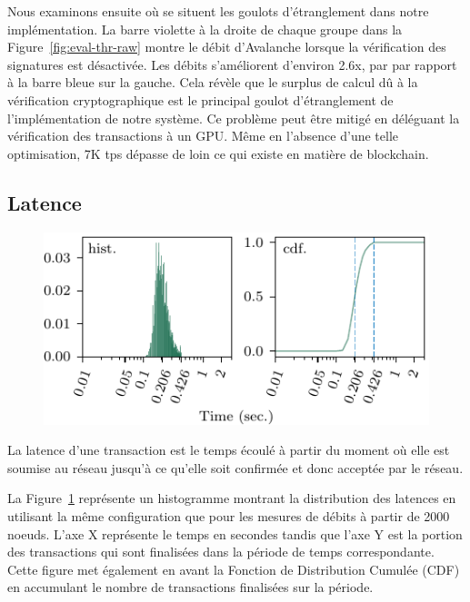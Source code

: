 Nous examinons ensuite où se situent les goulots d'étranglement dans notre implémentation.
La barre violette à la droite de chaque groupe dans la Figure~\ref{fig:eval-thr-raw} montre le débit
d'Avalanche lorsque la vérification des signatures est désactivée. Les débits s'améliorent d'environ 2.6x, par
par rapport à la barre bleue sur la gauche.
Cela révèle que le surplus de calcul dû à la vérification cryptographique est le principal goulot d'étranglement
de l'implémentation de notre système. Ce problème peut être mitigé en déléguant la vérification des transactions
à un GPU\@. Même en l'absence d'une telle optimisation, 7K tps dépasse de loin ce qui existe en matière de blockchain.

\subsection{Latence}

\begin{figure}
\includegraphics[width=\linewidth]{figures/lat.pdf}
\label{fig:eval-lat1}
\end{figure}

La latence d'une transaction est le temps écoulé à partir du moment où elle est soumise au réseau jusqu'à ce qu'elle
soit confirmée et donc acceptée par le réseau.

La Figure~\ref{fig:eval-lat1} représente un histogramme montrant la distribution des latences en utilisant la
même configuration que pour les mesures de débits à partir de 2000 noeuds. L'axe X représente le temps en secondes
tandis que l'axe Y est la portion des transactions qui sont finalisées dans la période de temps correspondante.
Cette figure met également en avant la Fonction de Distribution Cumulée (CDF) en accumulant le nombre de
transactions finalisées sur la période.

